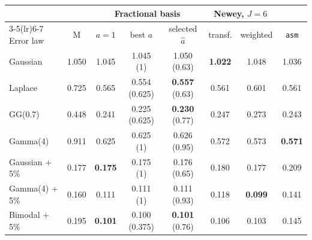 \begin{tabular}{lccccccc}
\toprule
 & & \multicolumn{3}{c}{Fractional basis} & \multicolumn{2}{c}{Newey, $J=6$} & \\
\cmidrule(lr){3-5}\cmidrule(lr){6-7}
Error law & M & $a=1$ & best $a$ & selected $\hat a$ & transf. & weighted & \texttt{asm} \\
\midrule
Gaussian & 1.050 & 1.045 & 1.045 (1) & 1.050 (0.63) & \textbf{1.022} & 1.048 & 1.036 \\
Laplace & 0.725 & 0.565 & 0.554 (0.625) & \textbf{0.557} (0.63) & 0.561 & 0.601 & 0.561 \\
GG(0.7) & 0.448 & 0.241 & 0.225 (0.625) & \textbf{0.230} (0.77) & 0.247 & 0.273 & 0.243 \\
Gamma(4) & 0.911 & 0.625 & 0.625 (1) & 0.626 (0.95) & 0.572 & 0.573 & \textbf{0.571} \\
Gaussian + 5\% & 0.177 & \textbf{0.175} & 0.175 (1) & 0.176 (0.65) & 0.180 & 0.177 & 0.209 \\
Gamma(4) + 5\% & 0.160 & 0.111 & 0.111 (1) & 0.111 (0.93) & 0.118 & \textbf{0.099} & 0.141 \\
Bimodal + 5\% & 0.195 & \textbf{0.101} & 0.100 (0.375) & \textbf{0.101} (0.76) & 0.106 & 0.103 & 0.145 \\
\bottomrule
\end{tabular}
